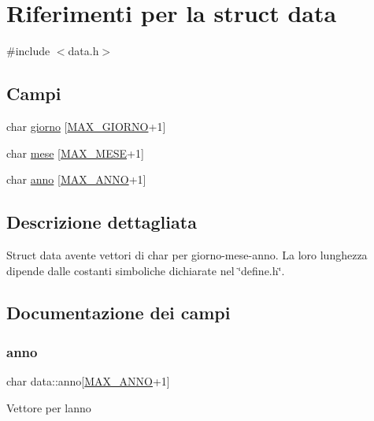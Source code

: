 \hypertarget{structdata}{}\section{Riferimenti per la struct data}
\label{structdata}


{\ttfamily \#include $<$data.\+h$>$}

\subsection*{Campi}
\begin{DoxyCompactItemize}
\item 
char \hyperlink{structdata_aa047e2a45a7db811192b5ca652dfdba0}{giorno} \mbox{[}\hyperlink{define_8h_a621e6dff6cb0b798f6ca47b15f7d7fcb}{M\+A\+X\+\_\+\+G\+I\+O\+R\+NO}+1\mbox{]}
\item 
char \hyperlink{structdata_acf4492d0a20c3a79802f2b56b8f3a1e7}{mese} \mbox{[}\hyperlink{define_8h_a32df43954eb6eea4b4e07751068f97f7}{M\+A\+X\+\_\+\+M\+E\+SE}+1\mbox{]}
\item 
char \hyperlink{structdata_a78d7c15dfeffaf63e1f0570199e5a5bb}{anno} \mbox{[}\hyperlink{define_8h_abe4076ab2e7aff3f56f45822352824ad}{M\+A\+X\+\_\+\+A\+N\+NO}+1\mbox{]}
\end{DoxyCompactItemize}


\subsection{Descrizione dettagliata}
Struct data avente vettori di char per giorno-\/mese-\/anno. La loro lunghezza dipende dalle costanti simboliche dichiarate nel \char`\"{}define.\+h\char`\"{}. 

\subsection{Documentazione dei campi}
\mbox{\label{structdata_a78d7c15dfeffaf63e1f0570199e5a5bb}} 
\subsubsection{\texorpdfstring{anno}{anno}}
{\footnotesize\ttfamily char data\+::anno\mbox{[}\hyperlink{define_8h_abe4076ab2e7aff3f56f45822352824ad}{M\+A\+X\+\_\+\+A\+N\+NO}+1\mbox{]}}

Vettore per l\textquotesingle{}anno \mbox{\label{structdata_aa047e2a45a7db811192b5ca652dfdba0}} 
